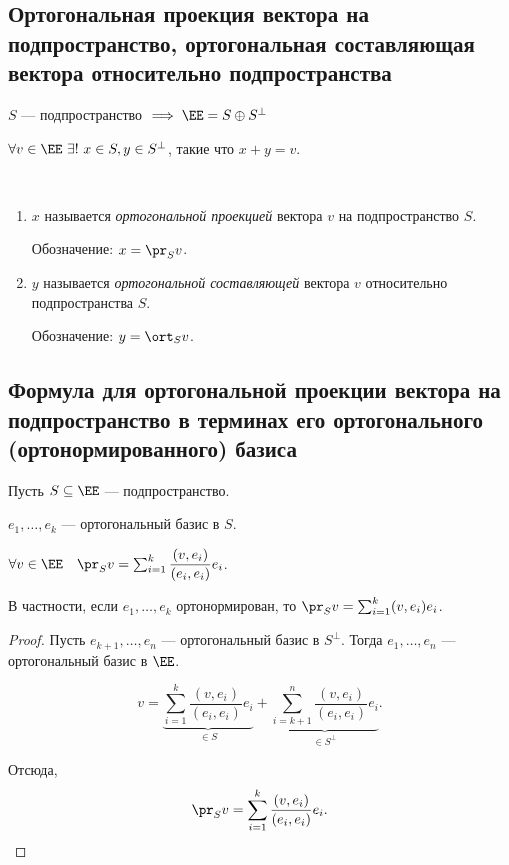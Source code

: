 \subsection{Ортогональная проекция вектора на подпространство, ортогональная составляющая вектора относительно подпространства}

$S$ --- подпространство $ \implies \EE = S \oplus S^{\perp}$

$\forall v \in \EE \ \exists! \ x \in S, y \in S^{\perp}$, такие что $x + y = v$.

\begin{definition}~
    \begin{enumerate}
    \item 
        $x$ называется \textit{ортогональной проекцией} вектора $v$ на подпространство $S$.

        Обозначение: $x = \pr_S v$.

    \item
        $y$ называется \textit{ортогональной составляющей} вектора $v$ относительно подпространства $S$.

        Обозначение: $y = \ort_S v$.
    \end{enumerate}
\end{definition}


\subsection{Формула для ортогональной проекции вектора на подпространство в терминах его ортогонального (ортонормированного) базиса}


Пусть $S \subseteq \EE$ --- подпространство.

$e_1, \dots, e_k$ --- ортогональный базис в $S$.

\begin{proposal}
    $\forall v \in \EE \quad \pr_S v = \sum_{i = 1}^{k} \dfrac{(v, e_i)}{(e_i, e_i)} e_i$.

    В частности, если $e_1, \dots, e_k$ ортонормирован, то $\pr_S v = \sum_{i = 1}^{k} (v, e_i) e_i$.
\end{proposal}

\begin{proof}
    Пусть $e_{k + 1}, \dots, e_n$ --- ортогональный базис в $S^{\perp}$. Тогда $e_1, \dots, e_n$ --- ортогональный базис в $\EE$.

    \begin{equation*}
        v = \underbrace{\sum_{i = 1}^{k} \dfrac{(v, e_i)}{(e_i, e_i)} e_i}_{\in S} + \underbrace{\sum_{i = k + 1}^{n} \dfrac{(v, e_i)}{(e_i, e_i)} e_i}_{\in S^{\perp}}
    .\end{equation*}

    Отсюда,
    \begin{equation*}
        \pr_S v = \sum_{i = 1}^{k} \dfrac{(v, e_i)}{(e_i, e_i)} e_{i}
    .\qedhere\end{equation*}
\end{proof}


